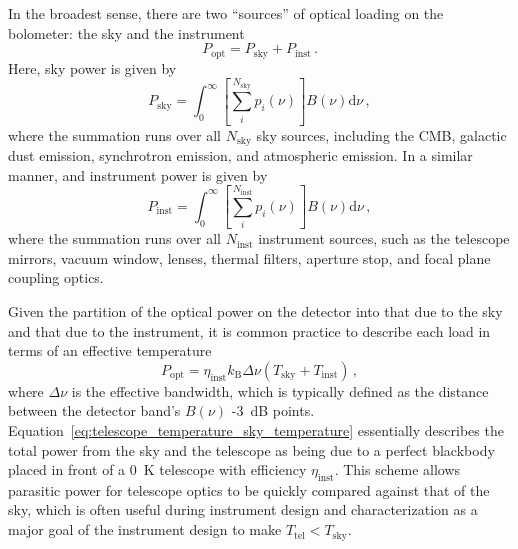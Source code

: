In the broadest sense, there are two ``sources'' of optical loading on the bolometer: the sky and the instrument
\begin{equation}
    P_{\mathrm{opt}} = P_{\mathrm{sky}} + P_{\mathrm{inst}} \, .
    \label{eq:sky_and_instrument_power}
\end{equation}
Here, sky power is given by
\begin{equation}
    P_{\mathrm{sky}} = \int_{0}^{\infty} \left[ \sum_{i}^{N_{\mathrm{sky}}} p_{i} (\nu) \right] B (\nu) \mathrm{d} \nu \, ,
    \label{eq:sky_power}
\end{equation}
where the summation runs over all $N_{\mathrm{sky}}$ sky sources, including the CMB, galactic dust emission, synchrotron emission, and atmospheric emission. In a similar manner, and instrument power is given by
\begin{equation}
    P_{\mathrm{inst}} = \int_{0}^{\infty} \left[ \sum_{i}^{N_{\mathrm{inst}}} p_{i} (\nu) \right] B (\nu) \mathrm{d} \nu \, ,
    \label{eq:inst_pow}
\end{equation}
where the summation runs over all $N_{\mathrm{inst}}$ instrument sources, such as the telescope mirrors, vacuum window, lenses, thermal filters, aperture stop, and focal plane coupling optics. 

Given the partition of the optical power on the detector into that due to the sky and that due to the instrument, it is common practice to describe each load in terms of an effective temperature
\begin{equation}
    P_{\mathrm{opt}} = \eta_{\mathrm{inst}} k_{\mathrm{B}} \Delta \nu \left( T_{\mathrm{sky}} + T_{\mathrm{inst}} \right) \, ,
    \label{eq:telescope_temperature_sky_temperature}
\end{equation}
where $\Delta \nu$ is the effective bandwidth, which is typically defined as the distance between the detector band's $B(\nu)$ -3~dB points. Equation~\ref{eq:telescope_temperature_sky_temperature} essentially describes the total power from the sky and the telescope as being due to a perfect blackbody placed in front of a 0~K telescope with efficiency $\eta_{\mathrm{inst}}$. This scheme allows parasitic power for telescope optics to be quickly compared against that of the sky, which is often useful during instrument design and characterization as a major goal of the instrument design to make $T_{\mathrm{tel}} < T_{\mathrm{sky}}$.


